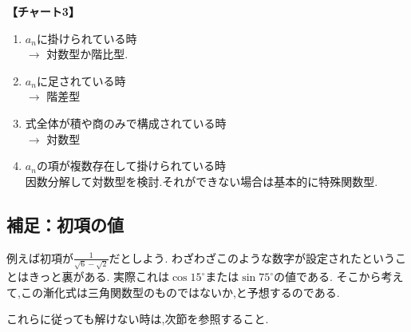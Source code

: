       \noindent \textbf{【チャート3】}
      \begin{enumerate}
        \item $a_n$に掛けられている時\\
              $\rightarrow$ 対数型か階比型.
        \item $a_n$に足されている時\\
              $\rightarrow$ 階差型
        \item 式全体が積や商のみで構成されている時\\
              $\rightarrow$ 対数型
        \item $a_n$の項が複数存在して掛けられている時\\
              因数分解して対数型を検討.それができない場合は基本的に特殊関数型.
      \end{enumerate}
      \subsection{補足：初項の値}
        例えば初項が$\displaystyle \frac{1}{\sqrt{6}-\sqrt{2}}$だとしよう.
        わざわざこのような数字が設定されたということはきっと裏がある.
        実際これは$\cos 15^\circ$または$\sin 75^\circ$の値である.
        そこから考えて,この漸化式は三角関数型のものではないか,と予想するのである.
      
      これらに従っても解けない時は,次節を参照すること.
   
